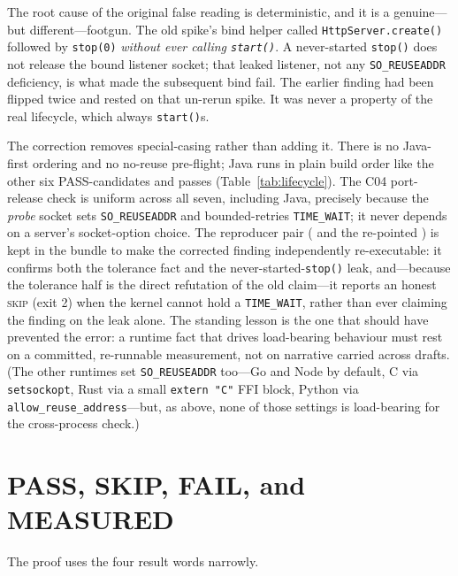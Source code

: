 \documentclass[11pt,letterpaper]{article}
\begin{document}
The root cause of the original false reading is deterministic, and it is
a genuine---but different---footgun. The old spike's bind helper called
\texttt{HttpServer.create()} followed by \texttt{stop(0)} \emph{without
ever calling \texttt{start()}}. A never-started \texttt{stop()} does not
release the bound listener socket; that leaked listener, not any
\texttt{SO\_REUSEADDR} deficiency, is what made the subsequent bind fail.
The earlier finding had been flipped twice and rested on that un-rerun
spike. It was never a property of the real lifecycle, which always
\texttt{start()}s.

The correction removes special-casing rather than adding it. There is no
Java-first ordering and no no-reuse pre-flight; Java runs in plain build
order like the other six PASS-candidates and passes (Table~\ref{tab:lifecycle}).
The C04 port-release check is uniform across all seven, including Java,
precisely because the \emph{probe} socket sets \texttt{SO\_REUSEADDR} and
bounded-retries \texttt{TIME\_WAIT}; it never depends on a server's
socket-option choice. The reproducer pair (
and the re-pointed ) is kept in the bundle to make
the corrected finding independently re-executable: it confirms both the
tolerance fact and the never-started-\texttt{stop()} leak, and---because
the tolerance half is the direct refutation of the old claim---it reports
an honest \textsc{skip} (exit 2) when the kernel cannot hold a
\texttt{TIME\_WAIT}, rather than ever claiming the finding on the leak
alone. The standing lesson is the one that should have prevented the
error: a runtime fact that drives load-bearing behaviour must rest on a
committed, re-runnable measurement, not on narrative carried across
drafts. (The other runtimes set \texttt{SO\_REUSEADDR} too---Go and Node
by default, C via \texttt{setsockopt}, Rust via a small \texttt{extern
"C"} FFI block, Python via \texttt{allow\_reuse\_address}---but, as above,
none of those settings is load-bearing for the cross-process check.)

\section{PASS, SKIP, FAIL, and MEASURED}

The proof uses the four result words narrowly.
\end{document}
